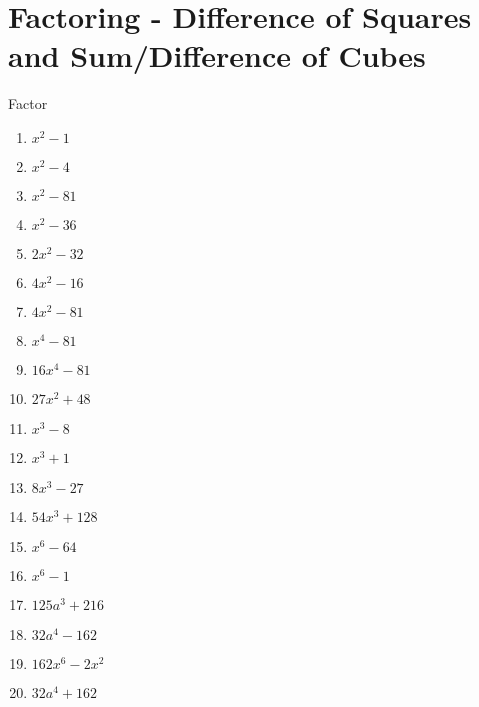 \section{Factoring - Difference of Squares and Sum/Difference of Cubes}
Factor\\
\begin{enumerate}
\item $x^{2} - 1$
\item $x^{2} - 4$
\item $x^{2} - 81$
\item $x^{2} - 36$
\item $2x^{2} - 32$
\item $4x^{2} - 16$
\item $4x^{2} - 81$
\item $x^{4} - 81$
\item $16x^{4} - 81$
\item $27x^{2} + 48$
\item $x^{3} - 8$
\item $x^{3} + 1$
\item $8x^{3} - 27$
\item $54x^{3} + 128$
\item $x^{6} - 64$
\item $x^{6} - 1$
\item $125a^{3} + 216$
\item $32a^{4} - 162$
\item $162x^{6} -2x^{2}$
\item $32a^{4} + 162$
\end{enumerate}
